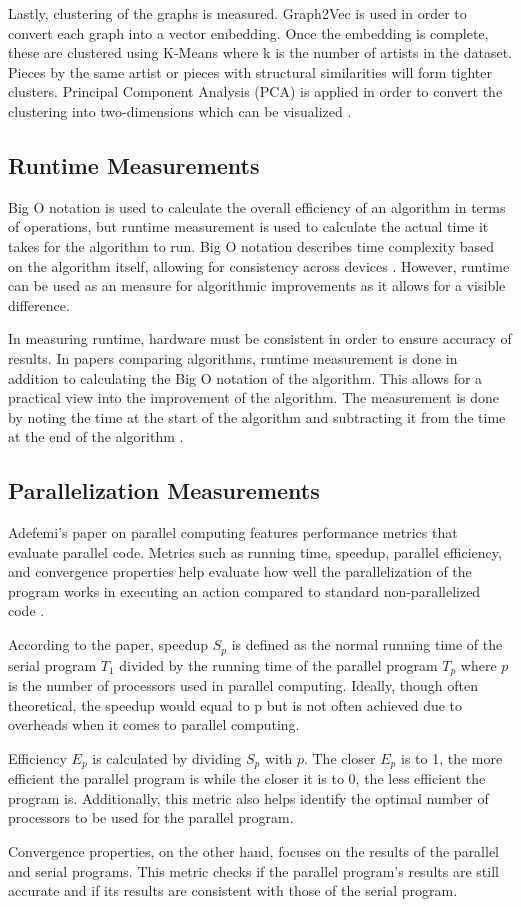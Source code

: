 Lastly, clustering of the graphs is measured. Graph2Vec is used in order to convert each graph into a vector embedding. Once the embedding is complete, these are clustered using K-Means where k is the number of artists in the dataset. Pieces by the same artist or pieces with structural similarities will form tighter clusters. Principal Component Analysis (PCA) is applied in order to convert the clustering into two-dimensions which can be visualized \cite{ConananEtAl}.

\subsection{Runtime Measurements}
Big O notation is used to calculate the overall efficiency of an algorithm in terms of operations, but runtime measurement is used to calculate the actual time it takes for the algorithm to run. Big O notation describes time complexity based on the algorithm itself, allowing for consistency across devices \cite{bigO}. However, runtime can be used as an measure for algorithmic improvements as it allows for a visible difference.

In measuring runtime, hardware must be consistent in order to ensure accuracy of results. In papers comparing algorithms, runtime measurement is done in addition to calculating the Big O notation of the algorithm. This allows for a practical view into the improvement of the algorithm. The measurement is done by noting the time at the start of the algorithm and subtracting it from the time at the end of the algorithm \cite{Durrani}\cite{Kanungo}.

\subsection{Parallelization Measurements}
Adefemi’s paper on parallel computing features performance metrics that evaluate parallel code. Metrics such as running time, speedup, parallel efficiency, and convergence properties help evaluate how well the parallelization of the program works in executing an action compared to standard non-parallelized code \cite{AdefemiParallelization}.

According to the paper, speedup $S_p$ is defined as the normal running time of the serial program $T_1$ divided by the running time of the parallel program $T_p$ where $p$ is the number of processors used in parallel computing. Ideally, though often theoretical, the speedup would equal to p but is not often achieved due to overheads when it comes to parallel computing.

Efficiency $E_p$ is calculated by dividing $S_p$ with $p$. The closer $E_p$ is to 1, the more efficient the parallel program is while the closer it is to 0, the less efficient the program is. Additionally, this metric also helps identify the optimal number of processors to be used for the parallel program.

Convergence properties, on the other hand, focuses on the results of the parallel and serial programs. This metric checks if the parallel program’s results are still accurate and if its results are consistent with those of the serial program.




